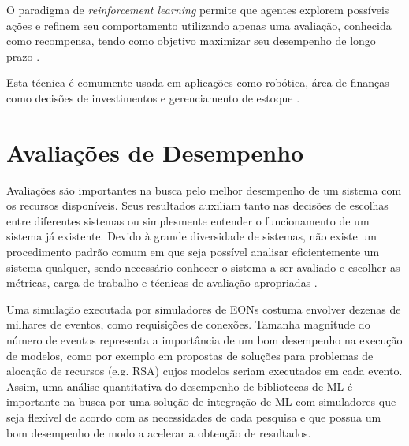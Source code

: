 O paradigma de \textit{reinforcement learning} permite que agentes explorem possíveis ações e refinem seu comportamento utilizando apenas uma avaliação, conhecida como recompensa, tendo como objetivo maximizar seu desempenho de longo prazo \cite{8527529}.

Esta técnica é comumente usada em aplicações como robótica, área de finanças como decisões de investimentos e gerenciamento de estoque \cite{8527529}.






\section{Avaliações de Desempenho}
\label{performance_analysis_theory}

Avaliações são importantes na busca pelo melhor desempenho de um sistema com os recursos disponíveis. Seus resultados auxiliam tanto nas decisões de escolhas entre diferentes sistemas ou simplesmente entender o funcionamento de um sistema já existente. Devido à grande diversidade de sistemas, não existe um procedimento padrão comum em que seja possível analisar eficientemente um sistema qualquer, sendo necessário conhecer o sistema a ser avaliado e escolher as métricas, carga de trabalho e técnicas de avaliação apropriadas \cite{jain1991art}.

Uma simulação executada por simuladores de EONs costuma envolver dezenas de milhares de eventos, como requisições de conexões. Tamanha magnitude do número de eventos representa a importância de um bom desempenho na execução de modelos, como por exemplo em propostas de soluções para problemas de alocação de recursos (e.g. RSA) cujos modelos seriam executados em cada evento. Assim, uma análise quantitativa do desempenho de bibliotecas de ML é importante na busca por uma solução de integração de ML com simuladores que seja flexível de acordo com as necessidades de cada pesquisa e que possua um bom desempenho de modo a acelerar a obtenção de resultados.

